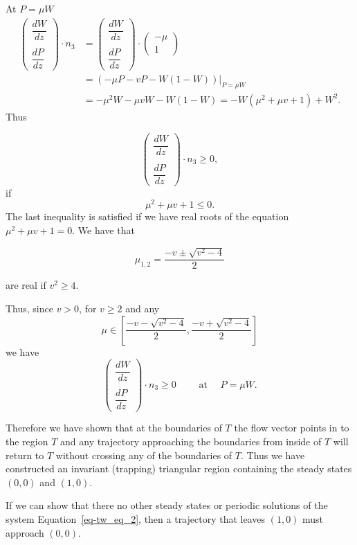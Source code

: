 \documentclass[
  letterpaper,
  DIV=11,
  numbers=noendperiod]{scrreprt}
\theoremstyle{plain}
\theoremstyle{definition}
\theoremstyle{plain}
\theoremstyle{remark}
\begin{document}
At \(P=\mu W\) \[
\begin{aligned}
\begin{pmatrix} 
\dfrac{ dW}{dz} \\  \\ \dfrac{dP}{dz}
\end{pmatrix} \cdot n_3 &= \begin{pmatrix} 
\dfrac{ dW}{dz} \\  \\ \dfrac{dP}{dz}
\end{pmatrix}\cdot  \begin{pmatrix} 
-\mu \\ 1
\end{pmatrix} \\
& =\left(  - \mu  P - vP -  W(1-W)\right) \Big|_{P=\mu W}  \\
&=   - \mu^2 W - \mu v W - W(1-W) = - W( \mu^2 + \mu v + 1) + W^2.
\end{aligned}
\] Thus

\[
\begin{pmatrix} 
\dfrac{ dW}{dz} \\  \\ \dfrac{dP}{dz}
\end{pmatrix} \cdot n_3 \geq 0,
\] if \[
\mu^2 + \mu v + 1 \leq 0.
\] The last inequality is satisfied if we have real roots of the
equation \(\mu^2 + \mu v + 1 = 0\). We have that

\[
\mu_{1,2} = \frac{ - v \pm \sqrt{ v^2 -4}} 2
\]

are real if \(v^2 \geq 4\).

Thus, since \(v >0\), for \(v \geq 2\) and any \[
\mu\in \left[ \dfrac{ - v -\sqrt{ v^2 -4}} 2, \dfrac{ - v +\sqrt{ v^2 -4}} 2 \right]
\] we have \[
\begin{pmatrix} 
\dfrac{ dW}{dz} \\  \\ \dfrac{dP}{dz}
\end{pmatrix} \cdot n_3 \geq 0 \qquad \text{ at } \quad P=\mu W. 
\]

Therefore we have shown that at the boundaries of \(T\) the flow vector
points in to the region \(T\) and any trajectory approaching the
boundaries from inside of \(T\) will return to \(T\) without crossing
any of the boundaries of \(T\). Thus we have constructed an invariant
(trapping) triangular region containing the steady states \((0,0)\) and
\((1,0)\).

If we can show that there no other steady states or periodic solutions
of the system Equation~\ref{eq-tw_eq_2}, then a trajectory that leaves
\((1,0)\) must approach \((0,0)\).
\end{document}
